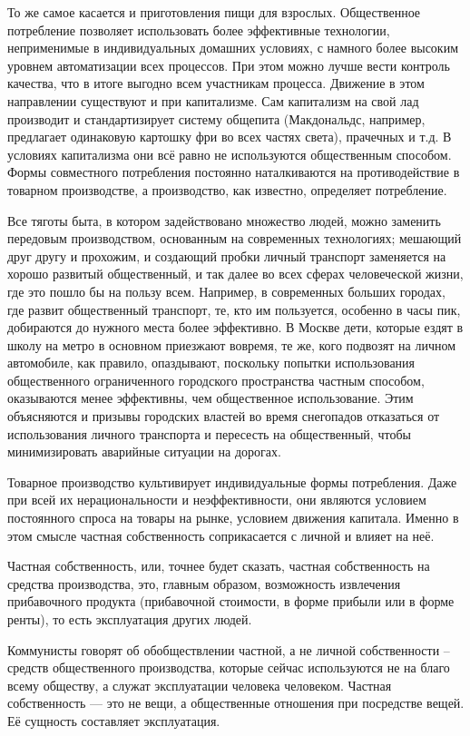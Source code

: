 \documentclass[12pt,a4paper,openany]{book}
\begin{document}
То же самое касается и приготовления пищи для взрослых. Общественное потребление позволяет использовать более эффективные технологии, неприменимые в индивидуальных домашних условиях, с намного более высоким уровнем автоматизации всех процессов. При этом можно лучше вести контроль качества, что в итоге выгодно всем участникам процесса. Движение в этом направлении существуют и при капитализме. Сам капитализм на свой лад производит и стандартизирует систему общепита (Макдональдс, например, предлагает одинаковую картошку фри во всех частях света), прачечных и т.д. В условиях капитализма они всё равно не используются общественным способом. Формы совместного потребления постоянно наталкиваются на противодействие в товарном производстве, а производство, как известно, определяет потребление.

Все тяготы быта, в котором задействовано множество людей, можно заменить передовым производством, основанным на современных технологиях; мешающий друг другу и прохожим, и создающий пробки личный транспорт заменяется на хорошо развитый общественный, и так далее во всех сферах человеческой жизни, где это пошло бы на пользу всем. Например, в современных больших городах, где развит общественный транспорт, те, кто им пользуется, особенно в часы пик, добираются до нужного места более эффективно. В Москве дети, которые ездят в школу на метро в основном приезжают вовремя, те же, кого подвозят на личном автомобиле, как правило, опаздывают, поскольку попытки использования общественного ограниченного городского пространства частным способом, оказываются менее эффективны, чем общественное использование. Этим объясняются и призывы городских властей во время снегопадов отказаться от использования личного транспорта и пересесть на общественный, чтобы минимизировать аварийные ситуации на дорогах.

Товарное производство культивирует индивидуальные формы потребления. Даже при всей их нерациональности и неэффективности, они являются условием постоянного спроса на товары на рынке, условием движения капитала. Именно в этом смысле частная собственность соприкасается с личной и влияет на неё.

Частная собственность, или, точнее будет сказать, частная собственность на средства производства, это, главным образом, возможность извлечения прибавочного продукта (прибавочной стоимости, в форме прибыли или в форме ренты), то есть эксплуатация других людей.

Коммунисты говорят об обобществлении частной, а не личной собственности – средств общественного производства, которые сейчас используются не на благо всему обществу, а служат эксплуатации человека человеком. Частная собственность — это не вещи, а общественные отношения при посредстве вещей. Её сущность составляет эксплуатация.
\end{document}

